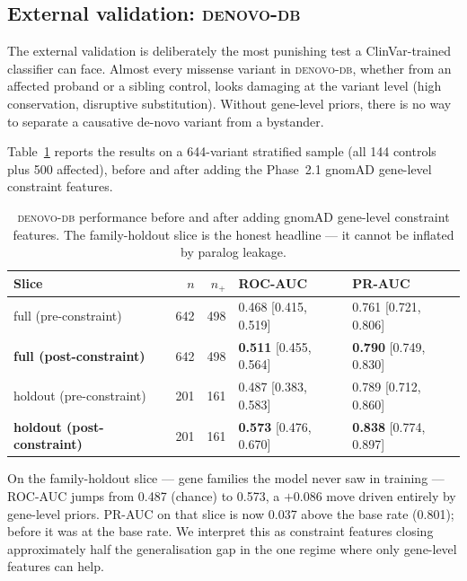 \documentclass[11pt,a4paper]{article}
\begin{document}
\subsection{External validation: \textsc{denovo-db}}
\label{sec:results-external}

The external validation is deliberately the most punishing test
a ClinVar-trained classifier can face. Almost every missense
variant in \textsc{denovo-db}, whether from an affected proband or
a sibling control, looks damaging at the variant level (high
conservation, disruptive substitution). Without gene-level
priors, there is no way to separate a causative de-novo variant
from a bystander.

Table~\ref{tab:external} reports the results on a
644-variant stratified sample (all 144 controls plus 500 affected),
before and after adding the Phase~2.1 gnomAD gene-level constraint
features.

\begin{table}[h]
\centering
\caption{\textsc{denovo-db} performance before and after adding
gnomAD gene-level constraint features. The family-holdout slice
is the honest headline --- it cannot be inflated by paralog
leakage.}
\label{tab:external}
\small
\begin{tabular}{@{} l r r l l @{}}
\toprule
\textbf{Slice} & \(n\) & \(n_+\) & \textbf{ROC-AUC} & \textbf{PR-AUC} \\
\midrule
full (pre-constraint)            & 642 & 498 & 0.468 [0.415, 0.519] & 0.761 [0.721, 0.806] \\
\textbf{full (post-constraint)}  & 642 & 498 & \textbf{0.511} [0.455, 0.564] & \textbf{0.790} [0.749, 0.830] \\
holdout (pre-constraint)         & 201 & 161 & 0.487 [0.383, 0.583] & 0.789 [0.712, 0.860] \\
\textbf{holdout (post-constraint)} & 201 & 161 & \textbf{0.573} [0.476, 0.670] & \textbf{0.838} [0.774, 0.897] \\
\bottomrule
\end{tabular}
\end{table}

On the family-holdout slice --- gene families the model never
saw in training --- ROC-AUC jumps from 0.487 (chance) to 0.573,
a \(+0.086\) move driven entirely by gene-level priors. PR-AUC
on that slice is now 0.037 above the base rate (0.801); before
it was at the base rate. We interpret this as constraint features
closing approximately half the generalisation gap in the one
regime where only gene-level features can help.
\end{document}
